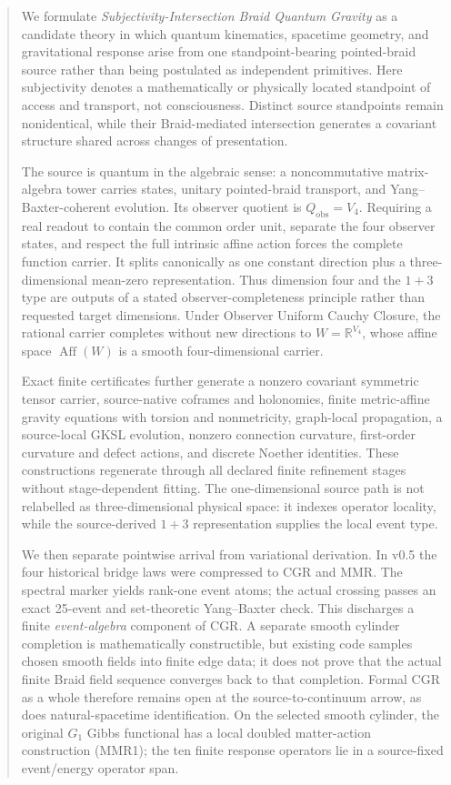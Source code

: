 \documentclass[11pt]{article}
\theoremstyle{definition}
\theoremstyle{remark}
\begin{document}
\begin{abstract}
We formulate \emph{Subjectivity-Intersection Braid Quantum Gravity} as a candidate theory in which quantum kinematics, spacetime geometry, and gravitational response arise from one standpoint-bearing pointed-braid source rather than being postulated as independent primitives. Here subjectivity denotes a mathematically or physically located standpoint of access and transport, not consciousness. Distinct source standpoints remain nonidentical, while their Braid-mediated intersection generates a covariant structure shared across changes of presentation.

The source is quantum in the algebraic sense: a noncommutative matrix-algebra tower carries states, unitary pointed-braid transport, and Yang--Baxter-coherent evolution. Its observer quotient is $Q_{\mathrm{obs}}=V_4$. Requiring a real readout to contain the common order unit, separate the four observer states, and respect the full intrinsic affine action forces the complete function carrier. It splits canonically as one constant direction plus a three-dimensional mean-zero representation. Thus dimension four and the $1+3$ type are outputs of a stated observer-completeness principle rather than requested target dimensions. Under Observer Uniform Cauchy Closure, the rational carrier completes without new directions to $W=\mathbb R^{V_4}$, whose affine space $\operatorname{Aff}(W)$ is a smooth four-dimensional carrier.

Exact finite certificates further generate a nonzero covariant symmetric tensor carrier, source-native coframes and holonomies, finite metric-affine gravity equations with torsion and nonmetricity, graph-local propagation, a source-local GKSL evolution, nonzero connection curvature, first-order curvature and defect actions, and discrete Noether identities. These constructions regenerate through all declared finite refinement stages without stage-dependent fitting. The one-dimensional source path is not relabelled as three-dimensional physical space: it indexes operator locality, while the source-derived $1+3$ representation supplies the local event type.

We then separate pointwise arrival from variational derivation. In v0.5 the four historical bridge laws were compressed to CGR and MMR. The spectral marker yields rank-one event atoms; the actual crossing passes an exact 25-event and set-theoretic Yang--Baxter check. This discharges a finite \emph{event-algebra} component of CGR. A separate smooth cylinder completion is mathematically constructible, but existing code samples chosen smooth fields into finite edge data; it does not prove that the actual finite Braid field sequence converges back to that completion. Formal CGR as a whole therefore remains open at the source-to-continuum arrow, as does natural-spacetime identification. On the selected smooth cylinder, the original $G_1$ Gibbs functional has a local doubled matter-action construction (MMR1); the ten finite response operators lie in a source-fixed event/energy operator span.


\end{abstract}
\end{document}
